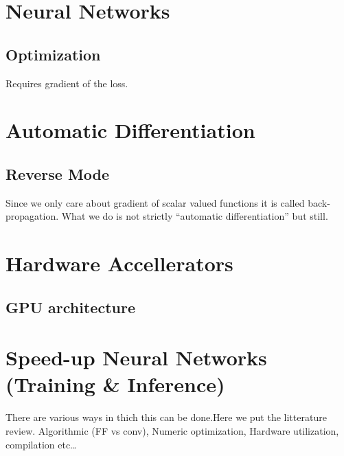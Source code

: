 \documentclass{article}
\begin{document}
\makeindex

\section{Neural Networks}
\subsection{Optimization}
Requires gradient of the loss.
\section{Automatic Differentiation}
\subsection{Reverse Mode}
Since we only care about gradient of scalar valued functions it is called
back-propagation. What we do is not strictly ``automatic differentiation'' but
still.
\section{Hardware Accellerators}
\subsection{GPU architecture}
\section{Speed-up Neural Networks (Training & Inference)}
There are various ways in thich this can be done.Here we put the litterature
review. Algorithmic (FF vs conv), Numeric optimization, Hardware utilization,
compilation etc\dots
\end{document}
